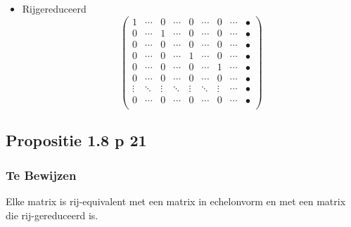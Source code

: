 \documentclass[lineaire_algebra_oplossingen.tex]{subfiles}
\begin{document}
\begin{itemize}
\item Rijgereduceerd
\[
\begin{pmatrix}
1 & \cdots & 0 & \cdots & 0 & \cdots & 0 & \cdots & \bullet\\
0 & \cdots & 1 & \cdots & 0 & \cdots & 0 & \cdots & \bullet\\
0 & \cdots & 0 & \cdots & 0 & \cdots & 0 & \cdots & \bullet\\
0 & \cdots & 0 & \cdots & 1 & \cdots & 0 & \cdots & \bullet\\
0 & \cdots & 0 & \cdots & 0 & \cdots & 1 & \cdots & \bullet\\
0 & \cdots & 0 & \cdots & 0 & \cdots & 0 & \cdots & \bullet\\
\vdots & \ddots & \vdots & \ddots & \vdots & \ddots & \vdots & \cdots & \bullet\\
0 & \cdots & 0 & \cdots & 0 & \cdots & 0 & \cdots & \bullet\\
\end{pmatrix}
\]
\end{itemize}


\subsection{Propositie 1.8 p 21}
\label{1.8}

\subsubsection*{Te Bewijzen}
Elke matrix is rij-equivalent met een matrix in echelonvorm en met een matrix die rij-gereduceerd is.
\end{document}
